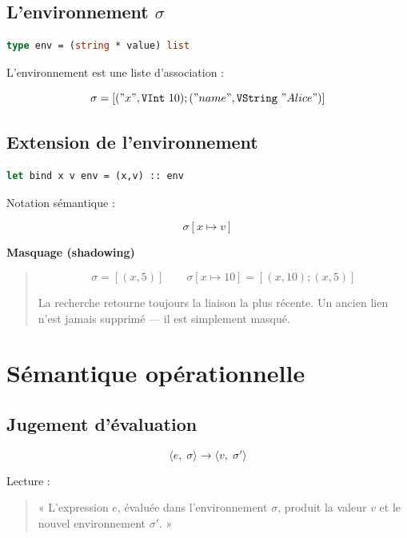 \documentclass[11pt,a4paper]{article}
\newcommand{\sem}[4]{%
  \langle #1,\;#2\rangle \rightarrow \langle #3,\;#4\rangle}
\newcommand{\ext}[3]{#1\!\left[#2 \mapsto #3\right]}
\newcommand{\V}[1]{\mathtt{#1}}
\newenvironment{bloc}[1]
{
  \par\medskip
  \noindent\textbf{#1}
  \par
  \smallskip
  \begin{quote}
}
{
  \end{quote}
  \medskip
}
\begin{document}
\subsection{L'environnement $\sigma$}

\begin{lstlisting}[language=ml]
type env = (string * value) list
\end{lstlisting}

L'environnement est une liste d'association :

\[
\sigma =
[
("x", \V{VInt}\ 10);
("name", \V{VString}\ "Alice")
]
\]

\subsection{Extension de l'environnement}

\begin{lstlisting}[language=ml]
let bind x v env = (x,v) :: env
\end{lstlisting}

Notation sémantique :

\[
\ext{\sigma}{x}{v}
\]

\begin{bloc}{Masquage (shadowing)}
\[
\sigma = [(x,5)]
\qquad
\ext{\sigma}{x}{10} = [(x,10);(x,5)]
\]

La recherche retourne toujours la liaison la plus récente.
Un ancien lien n'est jamais supprimé --- il est simplement masqué.
\end{bloc}

\section{Sémantique opérationnelle}

\subsection{Jugement d'évaluation}

\[
\sem{e}{\sigma}{v}{\sigma'}
\]

Lecture :

\begin{quote}
« L'expression $e$, évaluée dans l'environnement $\sigma$,
produit la valeur $v$ et le nouvel environnement $\sigma'$. »
\end{quote}
\end{document}

